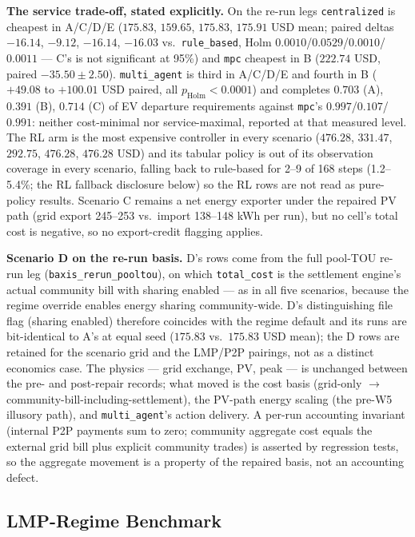 \documentclass[11pt,a4paper]{article}
\newcommand{\agent}[1]{\texttt{#1}}
\begin{document}
\textbf{The service trade-off, stated explicitly.} On the re-run legs
\agent{centralized} is cheapest in A/C/D/E ($175.83$, $159.65$, $175.83$,
$175.91$ USD mean; paired deltas $-16.14$, $-9.12$, $-16.14$, $-16.03$ vs.\
\agent{rule\_based}, Holm $0.0010$/$0.0529$/$0.0010$/$0.0011$ --- C's is not
significant at 95\%) and \agent{mpc} cheapest in B ($222.74$ USD, paired
$-35.50 \pm 2.50$). \agent{multi\_agent} is third in A/C/D/E and fourth in B
($+49.08$ to $+100.01$ USD paired, all $p_{\mathrm{Holm}} < 0.0001$) and
completes $0.703$ (A), $0.391$ (B), $0.714$ (C) of EV departure requirements
against \agent{mpc}'s $0.997$/$0.107$/$0.991$: neither cost-minimal nor
service-maximal, reported at that measured level. The RL arm is the most
expensive controller in every scenario ($476.28$, $331.47$, $292.75$,
$476.28$, $476.28$ USD) and its tabular policy is out of its observation
coverage in every scenario, falling back to rule-based for 2--9 of 168 steps
(1.2--5.4\%; the RL fallback disclosure below) so the RL rows are not read as
pure-policy results. Scenario C remains a net energy exporter under the
repaired PV path (grid export 245--253 vs.\ import 138--148 kWh per run), but
no cell's total cost is negative, so no export-credit flagging applies.

\textbf{Scenario D on the re-run basis.} D's rows come from the full pool-TOU
re-run leg (\texttt{baxis\_rerun\_pooltou}), on which \texttt{total\_cost} is
the settlement engine's actual community bill with sharing enabled --- as in
all five scenarios, because the regime override enables energy sharing
community-wide. D's distinguishing file flag (sharing enabled) therefore
coincides with the regime default and its runs are bit-identical to A's at
equal seed ($175.83$ vs.\ $175.83$ USD mean); the D rows are retained for the
scenario grid and the LMP/P2P pairings, not as a distinct economics case. The
physics --- grid exchange, PV, peak --- is unchanged between the pre- and
post-repair records; what moved is the cost basis (grid-only $\to$
community-bill-including-settlement), the PV-path energy scaling (the pre-W5
illusory path), and \agent{multi\_agent}'s action delivery. A per-run
accounting invariant (internal P2P payments sum to zero; community aggregate
cost equals the external grid bill plus explicit community trades) is asserted
by regression tests, so the aggregate movement is a property of the repaired
basis, not an accounting defect.

\subsection{LMP-Regime Benchmark}
\label{sec:lmp}
\end{document}
